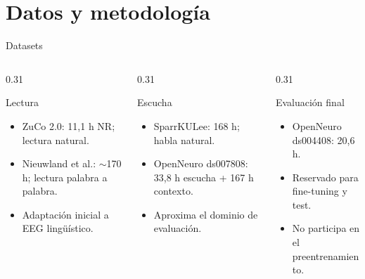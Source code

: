 \documentclass[aspectratio=169,10pt]{beamer}
\begin{document}
\section{Datos y metodología}

\begin{frame}[c]{Datasets}
  \small
  \begin{columns}[c,totalwidth=\linewidth]
    \begin{column}{0.31\linewidth}
      \begin{block}{Lectura}
        \begin{minipage}[t][29mm][t]{\linewidth}
        \begin{itemize}
          \item ZuCo 2.0: 11,1 h NR; lectura natural.
          \item Nieuwland et al.: $\sim$170 h; lectura palabra a palabra.
          \item Adaptación inicial a EEG lingüístico.
        \end{itemize}
        \end{minipage}
      \end{block}
    \end{column}

    \begin{column}{0.31\linewidth}
      \begin{block}{Escucha}
        \begin{minipage}[t][29mm][t]{\linewidth}
        \begin{itemize}
          \item SparrKULee: 168 h; habla natural.
          \item OpenNeuro ds007808: 33,8 h escucha + 167 h contexto.
          \item Aproxima el dominio de evaluación.
        \end{itemize}
        \end{minipage}
      \end{block}
    \end{column}

    \begin{column}{0.31\linewidth}
      \begin{alertblock}{Evaluación final}
        \begin{minipage}[t][29mm][t]{\linewidth}
        \begin{itemize}
          \item OpenNeuro ds004408: 20,6 h.
          \item Reservado para fine-tuning y test.
          \item No participa en el preentrenamiento.
        \end{itemize}
        \end{minipage}
      \end{alertblock}
    \end{column}
  \end{columns}


\end{frame}
\end{document}
